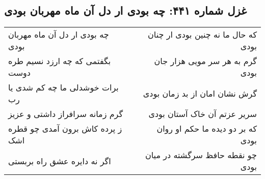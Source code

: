 \begin{center}
\section*{غزل شماره ۴۴۱: چه بودی ار دل آن ماه مهربان بودی}
\label{sec:sh441}
\begin{longtable}{l p{0.5cm} r}
چه بودی ار دل آن ماه مهربان بودی
&&
که حال ما نه چنین بودی ار چنان بودی
\\
بگفتمی که چه ارزد نسیم طره دوست
&&
گرم به هر سر مویی هزار جان بودی
\\
برات خوشدلی ما چه کم شدی یا رب
&&
گرش نشان امان از بد زمان بودی
\\
گرم زمانه سرافراز داشتی و عزیز
&&
سریر عزتم آن خاک آستان بودی
\\
ز پرده کاش برون آمدی چو قطره اشک
&&
که بر دو دیده ما حکم او روان بودی
\\
اگر نه دایره عشق راه بربستی
&&
چو نقطه حافظ سرگشته در میان بودی
\\
\end{longtable}
\end{center}
